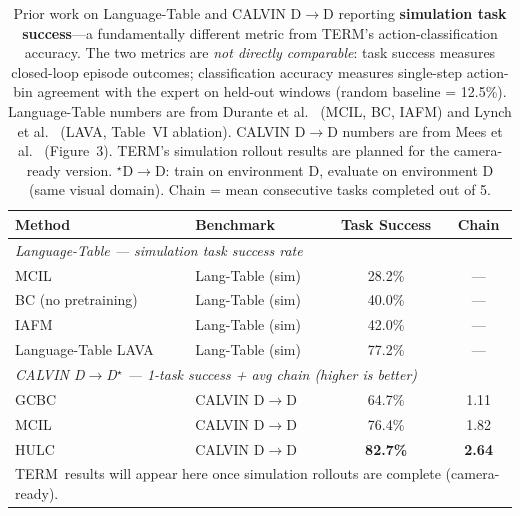 \documentclass{article}
\renewcommand{\arraystretch}{1.25}
\newcommand{\modelname}{\textsc{TERM}\xspace}
\begin{document}
\begin{table}[h]
\centering
\caption{Prior work on Language-Table and CALVIN D$\to$D reporting
  \textbf{simulation task success}---a fundamentally different metric from
  \modelname's action-classification accuracy.
  The two metrics are \emph{not directly comparable}: task success measures
  closed-loop episode outcomes; classification accuracy measures single-step
  action-bin agreement with the expert on held-out windows (random baseline = 12.5\%).
  Language-Table numbers are from Durante et al.~\citep{durante2024agent} (MCIL, BC, IAFM)
  and Lynch et al.~\citep{lynch2023languagetable} (LAVA, Table~VI ablation).
  CALVIN D$\to$D numbers are from Mees et al.~\citep{mees2022hulc} (Figure~3).
  \modelname's simulation rollout results are planned for the camera-ready version.
  $^\star$D$\to$D: train on environment D, evaluate on environment D (same visual domain).
  Chain = mean consecutive tasks completed out of 5.}
\label{tab:prior_lt_calvin}
\small
\setlength{\tabcolsep}{4pt}
\renewcommand{\arraystretch}{1.2}
\begin{tabular}{llcc}
\toprule
\textbf{Method} & \textbf{Benchmark} & \textbf{Task Success} & \textbf{Chain} \\
\midrule
\multicolumn{4}{l}{\textit{Language-Table — simulation task success rate~\citep{durante2024agent,lynch2023languagetable}}} \\
MCIL~\citep{durante2024agent}
  & Lang-Table (sim) & 28.2\% & — \\
BC (no pretraining)~\citep{durante2024agent}
  & Lang-Table (sim) & 40.0\% & — \\
IAFM~\citep{durante2024agent}
  & Lang-Table (sim) & 42.0\% & — \\
Language-Table LAVA~\citep{lynch2023languagetable}
  & Lang-Table (sim) & 77.2\% & — \\
\midrule
\multicolumn{4}{l}{\textit{CALVIN D$\to$D$^\star$ — 1-task success + avg chain (higher is better)~\citep{mees2022hulc}}} \\
GCBC~\citep{mees2022hulc}
  & CALVIN D$\to$D & 64.7\% & 1.11 \\
MCIL~\citep{mees2022hulc}
  & CALVIN D$\to$D & 76.4\% & 1.82 \\
HULC~\citep{mees2022hulc}
  & CALVIN D$\to$D & \textbf{82.7\%} & \textbf{2.64} \\
\bottomrule
\multicolumn{4}{l}{\footnotesize \modelname\ results will appear here once simulation rollouts are complete (camera-ready).} \\
\end{tabular}
\end{table}
\end{document}

